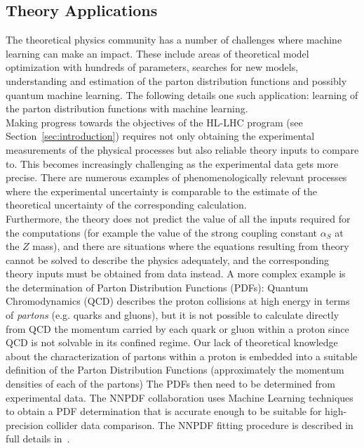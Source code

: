 \subsection{Theory Applications}

The theoretical physics community has a number of challenges where machine learning can make an impact. These include areas of theoretical model optimization with hundreds of parameters, searches for new models,  understanding and estimation of the parton distribution functions and possibly quantum machine learning. The following details one such application: learning of the parton distribution functions with machine learning.\\

Making progress towards the objectives of the HL-LHC program (see Section~\ref{sec:introduction}) requires not only
obtaining the experimental measurements of the physical processes but also reliable theory inputs to compare to. This becomes increasingly challenging as the experimental data gets more precise. There are numerous examples of phenomenologically relevant processes where the experimental uncertainty is comparable to the estimate of the theoretical uncertainty of the corresponding calculation.\\

Furthermore, the theory does not predict the value of all the inputs required for the computations (for example the
value of the strong coupling constant $\alpha_S$ at the $Z$ mass), and there are situations where the equations
resulting from theory cannot be solved to describe the physics adequately, and the corresponding theory inputs must be obtained from data instead. A more complex example is the determination of Parton Distribution Functions (PDFs): Quantum Chromodynamics (QCD) describes the proton collisions at high energy in terms of \emph{partons} (e.g. quarks and gluons), but it is not possible to calculate directly from QCD the momentum carried by each quark or gluon within a proton since QCD is not solvable in its confined regime. Our lack of theoretical knowledge about the characterization of
partons within a proton is embedded into a suitable definition of the Parton Distribution Functions (approximately the momentum densities of each of the partons) The PDFs then need to be determined from experimental data. The NNPDF collaboration uses Machine Learning techniques to obtain a PDF determination that is accurate enough to be suitable for high-precision collider data comparison. The NNPDF fitting procedure is described in full details in~\cite{Ball:2014uwa}.\\

